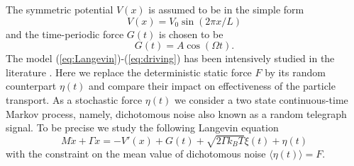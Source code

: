 \documentclass[12pt]{iopart}
\begin{document}
The symmetric potential $V(x)$ is assumed to be in the simple form
\begin{equation}	
	V(x) =  V_0 \sin(2\pi x/L) 
\end{equation}	
and the time-periodic force $G(t)$ is chosen to be
\begin{equation}
\label{eq:driving}	
	G(t) = A \cos(\Omega t).  
\end{equation}	
The model (\ref{eq:Langevin})-(\ref{eq:driving}) has been intensively studied in the literature \cite{MacKos2007,KosMac2008,acta_jj}. Here we replace the deterministic static force $F$ by its random counterpart  $\eta(t)$ and compare their impact on effectiveness of the particle transport. As a stochastic force $\eta(t)$ we 
consider a two state continuous-time Markov process, namely, dichotomous noise also known as a random telegraph signal. 
To be precise we study the following Langevin equation  
\begin{equation}
\label{eq:Langevin2}
M \ddot{x} + \Gamma \dot{x} = - V'(x) + G(t) + \sqrt{2\Gamma k_B T} \xi(t) + \eta(t)
\end{equation}
with the constraint on the mean value of dichotomous noise $\langle \eta(t) \rangle = F$.
\end{document}

